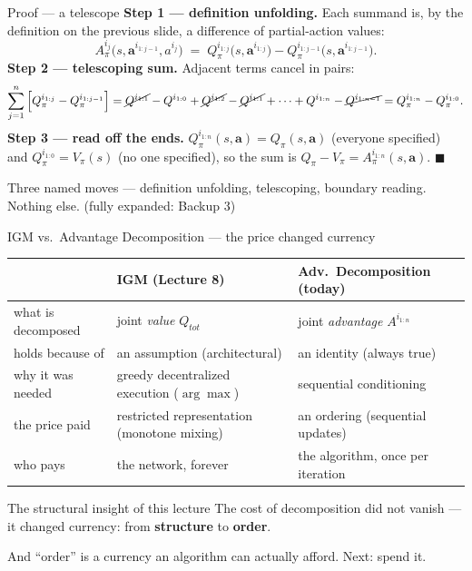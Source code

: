\documentclass[10pt, aspectratio=169]{beamer}
\begin{document}
\begin{frame}{Proof --- a telescope}
\textbf{Step 1 --- definition unfolding.} Each summand is, by the definition on the previous slide, a difference of partial-action values:
\[
A^{i_j}_{\pi}\big(s, \mathbf{a}^{i_{1:j-1}}, a^{i_j}\big) \;=\; Q^{i_{1:j}}_{\pi}\big(s,\mathbf{a}^{i_{1:j}}\big) - Q^{i_{1:j-1}}_{\pi}\big(s,\mathbf{a}^{i_{1:j-1}}\big).
\]
\pause
\textbf{Step 2 --- telescoping sum.} Adjacent terms cancel in pairs:
\[
\sum_{j=1}^{n} \Big[ Q^{i_{1:j}}_{\pi} - Q^{i_{1:j-1}}_{\pi} \Big]
= \cancel{Q^{i_{1:1}}} - Q^{i_{1:0}} + \cancel{Q^{i_{1:2}}} - \cancel{Q^{i_{1:1}}} + \dots + Q^{i_{1:n}} - \cancel{Q^{i_{1:n-1}}}
= Q^{i_{1:n}}_{\pi} - Q^{i_{1:0}}_{\pi}.
\]
\pause
\textbf{Step 3 --- read off the ends.} $Q^{i_{1:n}}_{\pi}(s,\mathbf{a}) = Q_\pi(s,\mathbf{a})$ (everyone specified) and $Q^{i_{1:0}}_{\pi} = V_\pi(s)$ (no one specified), so the sum is $Q_\pi - V_\pi = A^{i_{1:n}}_{\pi}(s,\mathbf{a})$. \hfill $\blacksquare$

\medskip
\pause
{\footnotesize Three named moves --- definition unfolding, telescoping, boundary reading. Nothing else. \textcolor{mLightBrown}{(fully expanded: Backup 3)}}
\end{frame}

\begin{frame}{IGM vs.\ Advantage Decomposition --- the price changed currency}
\begin{center}\footnotesize\renewcommand{\arraystretch}{1.55}
\begin{tabular}{l|l|l}
 & \textbf{IGM (Lecture 8)} & \textbf{Adv.\ Decomposition (today)} \\
\hline
what is decomposed & joint \emph{value} $Q_{tot}$ & joint \emph{advantage} $A^{i_{1:n}}$ \\
holds because of & an \alert{assumption} (architectural) & an \alert{identity} (always true) \\
why it was needed & greedy decentralized execution ($\arg\max$) & sequential conditioning \\
the price paid & restricted representation (monotone mixing) & an \alert{ordering} (sequential updates) \\
who pays & the network, forever & the algorithm, once per iteration \\
\end{tabular}
\end{center}
\medskip

\pause
\begin{block}{The structural insight of this lecture}
\centering
The cost of decomposition did not vanish ---\\ it \alert{changed currency}: from \textbf{structure} to \textbf{order}.
\end{block}
\medskip
\pause
And ``order'' is a currency an algorithm can actually afford. Next: spend it.
\end{frame}
\end{document}
